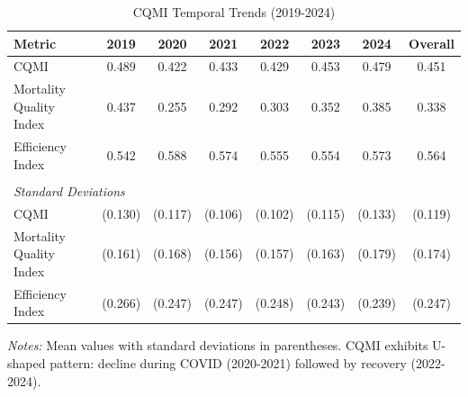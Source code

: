 \begin{table}[htbp]
\centering
\caption{CQMI Temporal Trends (2019-2024)}
\label{tab:cqmi_temporal}
\begin{tabular}{lccccccc}
\hline\hline
Metric & 2019 & 2020 & 2021 & 2022 & 2023 & 2024 & Overall \\
\hline
CQMI & 0.489 & 0.422 & 0.433 & 0.429 & 0.453 & 0.479 & 0.451 \\
Mortality Quality Index & 0.437 & 0.255 & 0.292 & 0.303 & 0.352 & 0.385 & 0.338 \\
Efficiency Index & 0.542 & 0.588 & 0.574 & 0.555 & 0.554 & 0.573 & 0.564 \\
\\
\multicolumn{8}{l}{\textit{Standard Deviations}} \\
CQMI & (0.130) & (0.117) & (0.106) & (0.102) & (0.115) & (0.133) & (0.119) \\
Mortality Quality Index & (0.161) & (0.168) & (0.156) & (0.157) & (0.163) & (0.179) & (0.174) \\
Efficiency Index & (0.266) & (0.247) & (0.247) & (0.248) & (0.243) & (0.239) & (0.247) \\
\hline\hline
\end{tabular}
\begin{tablenotes}
\small
\item \textit{Notes:} Mean values with standard deviations in parentheses. CQMI exhibits U-shaped pattern: decline during COVID (2020-2021) followed by recovery (2022-2024).
\end{tablenotes}
\end{table}